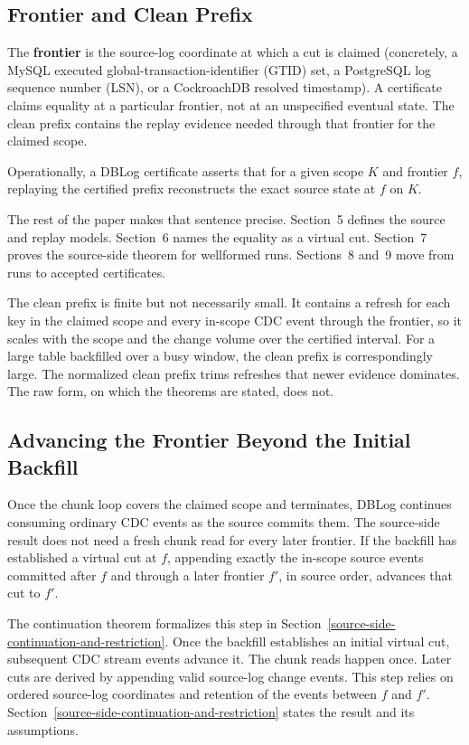 \documentclass[letterpaper,10pt,twocolumn]{article}
\begin{document}
\subsection{Frontier and Clean Prefix}\label{frontier-and-clean-prefix}

The \textbf{frontier} is the source-log coordinate at which a cut is
claimed (concretely, a MySQL executed global-transaction-identifier
(GTID) set, a PostgreSQL log sequence number (LSN), or a
CockroachDB resolved timestamp). A certificate claims equality at a
particular frontier, not at an unspecified eventual state. The clean prefix contains the
replay evidence needed through that frontier for the claimed scope.

Operationally, a DBLog certificate asserts that for a given scope $K$
and frontier $f$, replaying the certified prefix reconstructs the exact
source state at $f$ on $K$.

The rest of the paper makes that sentence precise. Section~5 defines the
source and replay models. Section~6 names the equality as a virtual cut.
Section~7 proves the source-side theorem for wellformed runs. Sections~8
and~9 move from runs to accepted certificates.

The clean prefix is finite but not necessarily small. It contains a
refresh for each key in the claimed scope and every in-scope CDC event
through the frontier, so it scales with the scope and the change
volume over the certified interval. For a large table backfilled
over a busy window, the clean prefix is correspondingly large. The
normalized clean prefix trims refreshes that newer evidence dominates.
The raw form, on which the theorems are stated, does not.

\subsection{Advancing the Frontier Beyond the Initial
Backfill}\label{after-the-chunk-loop}

Once the chunk loop covers the claimed scope and terminates, DBLog
continues consuming ordinary CDC events as the source commits them. The
source-side result does not need a fresh chunk read for every later
frontier. If the backfill has established a virtual cut at $f$, appending
exactly the in-scope source events committed after $f$ and through a later
frontier $f'$, in source order, advances that cut to $f'$.

The continuation theorem formalizes this step in
Section~\ref{source-side-continuation-and-restriction}. Once the backfill
establishes an initial virtual cut, subsequent CDC stream events advance
it. The chunk reads happen once. Later cuts are derived by appending
valid source-log change events. This step relies on ordered source-log
coordinates and retention of the events between $f$ and $f'$.
Section~\ref{source-side-continuation-and-restriction} states the result
and its assumptions.
\end{document}
